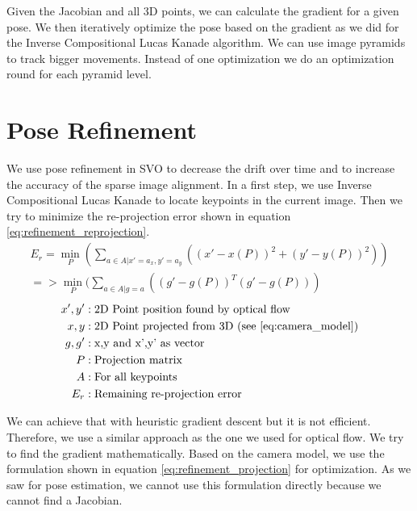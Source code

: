 \documentclass[11pt,a4paper,titlepage,oneside]{report}
\begin{document}
Given the Jacobian and all 3D points, we can calculate the gradient for a given pose. We then iteratively optimize the pose based on the gradient as we did for the Inverse Compositional Lucas Kanade algorithm. We can use image pyramids to track bigger movements. Instead of one optimization we do an optimization round for each pyramid level.

\chapter{Pose Refinement}\label{ch:pose_refinement}

We use pose refinement in SVO to decrease the drift over time and to increase the accuracy of the sparse image alignment. In a first step, we use Inverse Compositional Lucas Kanade to locate keypoints in the current image. Then we try to minimize the re-projection error shown in equation \ref{eq:refinement_reprojection}.
\begin{equation}\label{eq:refinement_reprojection}
  \begin{gathered}
    E_r=\min_P(\sum_{a \in A|x'=a_x,y'=a_y}((x'-x(P))^2+(y'-y(P))^2))\\
    =>\min_P(\sum_{a \in A|g=a}((g'-g(P))^T(g'-g(P)))
  \end{gathered}
\end{equation}
\begin{align*}
  x',y'   &: \text{2D Point position found by optical flow}\\
  x,y     &: \text{2D Point projected from 3D (see \ref{eq:camera_model})}\\
  g,g'    &: \text{x,y and x',y' as vector}\\
  P       &: \text{Projection matrix}\\
  A       &: \text{For all keypoints}\\
  E_r     &: \text{Remaining re-projection error}
\end{align*}

We can achieve that with heuristic gradient descent but it is not efficient. Therefore, we use a similar approach as the one we used for optical flow. We try to find the gradient mathematically. Based on the camera model, we use the formulation shown in equation \ref{eq:refinement_projection} for optimization. As we saw for pose estimation, we cannot use this formulation directly because we cannot find a Jacobian.
\end{document}

